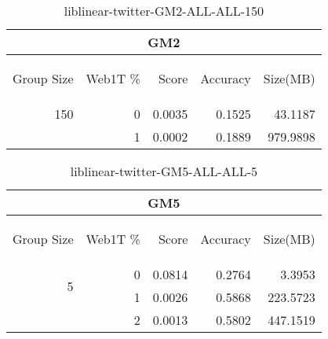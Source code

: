 \begin{center}
\begin{table}[htbp]
\begin{tabular}{ | r | r | r | r | r |}
\hline
\multicolumn{5}{|c|}{GM2}\\
\hline
\begin{sideways}Group Size\end{sideways} & \begin{sideways}Web1T \%\end{sideways} & \begin{sideways}Score\end{sideways} & \begin{sideways}Accuracy\end{sideways} & \begin{sideways}Size(MB)\end{sideways}\\
\hline
\multirow{1}{*}{150}
 & 0 & 0.0035 & 0.1525 & 43.1187\\ \cline{2-5}
 & 1 & 0.0002 & 0.1889 & 979.9898\\ \cline{2-5}
\hline
\end{tabular}
\caption{liblinear-twitter-GM2-ALL-ALL-150}
\label{table:liblinear-twitter-GM2-ALL-ALL-150}
\end{table}
\end{center}

\begin{center}
\begin{table}[htbp]
\begin{tabular}{ | r | r | r | r | r |}
\hline
\multicolumn{5}{|c|}{GM5}\\
\hline
\begin{sideways}Group Size\end{sideways} & \begin{sideways}Web1T \%\end{sideways} & \begin{sideways}Score\end{sideways} & \begin{sideways}Accuracy\end{sideways} & \begin{sideways}Size(MB)\end{sideways}\\
\hline
\multirow{2}{*}{5}
 & 0 & 0.0814 & 0.2764 & 3.3953\\ \cline{2-5}
 & 1 & 0.0026 & 0.5868 & 223.5723\\ \cline{2-5}
 & 2 & 0.0013 & 0.5802 & 447.1519\\ \cline{2-5}
\hline
\end{tabular}
\caption{liblinear-twitter-GM5-ALL-ALL-5}
\label{table:liblinear-twitter-GM5-ALL-ALL-5}
\end{table}
\end{center}

